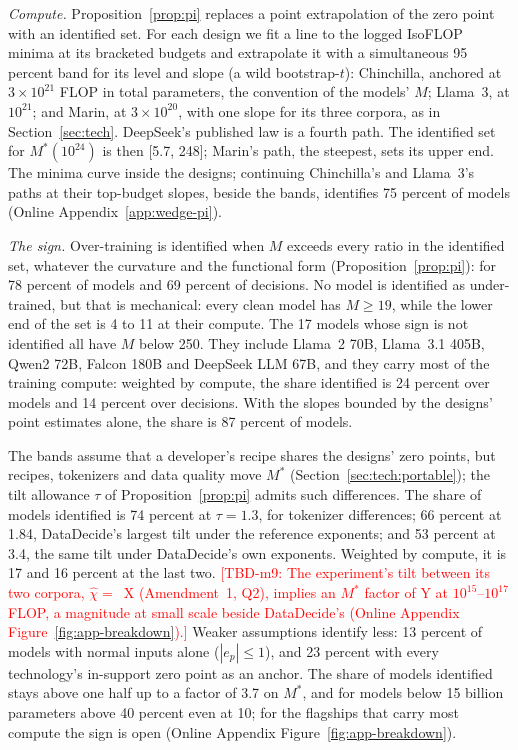 \textit{Compute.} Proposition~\ref{prop:pi} replaces a point extrapolation of the zero point with an identified set. For
each design we fit a line to the logged IsoFLOP minima at its bracketed budgets and extrapolate it with a simultaneous
95 percent band for its level and slope (a wild bootstrap-$t$): Chinchilla, anchored at $3\times10^{21}$ FLOP in total
parameters, the convention of the models' $M$; Llama~3, at $10^{21}$; and Marin, at $3\times10^{20}$, with one slope for
its three corpora, as in Section~\ref{sec:tech}. DeepSeek's published law is a fourth path. The identified set for
$M^*(10^{24})$ is then [5.7, 248]; Marin's path, the steepest, sets its upper end. The minima curve inside the designs;
continuing Chinchilla's and Llama~3's paths at their top-budget slopes, beside the bands, identifies 75 percent of
models (Online Appendix~\ref{app:wedge-pi}).

\textit{The sign.} Over-training is identified when $M$ exceeds every ratio in the identified set, whatever the curvature
and the functional form (Proposition~\ref{prop:pi}): for 78 percent of models and 69 percent of decisions. No model is
identified as under-trained, but that is mechanical: every clean model has $M\ge19$, while the lower end of the set is 4
to 11 at their compute. The 17 models whose sign is not identified all have $M$ below 250. They include Llama~2 70B,
Llama~3.1 405B, Qwen2 72B, Falcon 180B and DeepSeek LLM 67B, and they carry most of the training compute: weighted by
compute, the share identified is 24 percent over models and 14 percent over decisions. With the slopes bounded by the
designs' point estimates alone, the share is 87 percent of models.

The bands assume that a developer's recipe shares the designs' zero points, but recipes, tokenizers and data quality move
$M^*$ (Section~\ref{sec:tech:portable}); the tilt allowance $\tau$ of Proposition~\ref{prop:pi} admits such differences.
The share of models identified is 74 percent at $\tau=1.3$, for tokenizer differences; 66 percent at 1.84, DataDecide's
largest tilt under the reference exponents; and 53 percent at 3.4, the same tilt under DataDecide's own exponents.
Weighted by compute, it is 17 and 16 percent at the last two. \textcolor{red}{[TBD-m9: The experiment's tilt between its
two corpora, $\hat\chi=$~X (Amendment~1, Q2), implies an $M^*$ factor of Y at $10^{15}$--$10^{17}$ FLOP, a magnitude at
small scale beside DataDecide's (Online Appendix Figure~\ref{fig:app-breakdown}).]} Weaker assumptions identify less: 13
percent of models with normal inputs alone ($|e_p|\le1$), and 23 percent with every technology's in-support zero point as
an anchor. The share of models identified stays above one half up to a factor of 3.7 on $M^*$, and for models below 15
billion parameters above 40 percent even at 10; for the flagships that carry most compute the sign is open (Online
Appendix Figure~\ref{fig:app-breakdown}).

